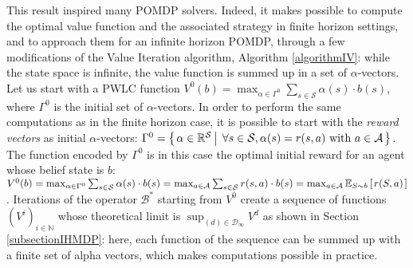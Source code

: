 This result inspired many POMDP solvers.
Indeed, it makes possible to compute the optimal value function and the associated strategy
in finite horizon settings, and to approach them for an infinite horizon POMDP,
through a few modifications of the Value Iteration algorithm, Algorithm \ref{algorithmIV}: 
while the state space is infinite, the value function is summed up in a set of $\alpha$-vectors.
Let us start with a PWLC function $V^0(b)= \displaystyle\max_{\alpha \in \Gamma^0} \sum_{s \in \mathcal{S}} \alpha(s) \cdot b(s)$,
where $\Gamma^0$ is the initial set of $\alpha$-vectors.
In order to perform the same computations as in the finite horizon case,
it is possible to start with the \textit{reward vectors} as initial $\alpha$-vectors:
$\Gamma^0 = \left\{ \left.  \alpha \in \mathbb{R}^{\mathcal{S}} \, \right| \left. \, \forall s \in \mathcal{S}, \alpha(s) = r(s,a) \mbox{ with } a \in \mathcal{A}  \right. \right\}$.
The function encoded by $\Gamma^0$ is in this case the optimal initial reward 
for an agent whose belief state is $b$:
$V^0(b) 
= \max_{\alpha \in \Gamma^0} \sum_{s \in \mathcal{S}} \alpha(s) \cdot b(s) 
= \max_{a \in \mathcal{A}} \sum_{s \in \mathcal{S}} r(s,a) \cdot b(s) 
= \max_{a \in \mathcal{A}} \mathbb{E}_{S \sim b} \left[ \left.  r(S,a)  \right. \right]$.
Iterations of the operator $\mathcal{B}^*$ starting from $V^0$
create a sequence of functions $(V^i)_{i \in \mathbb{N}}$ 
whose theoretical limit is  $\sup_{(d) \in \mathcal{D}_{\infty} } V^{d}$
as shown in Section 
\ref{subsectionIHMDP}:
here, each function of the sequence can be summed up 
with a finite set of alpha vectors,
which makes computations possible in practice.

